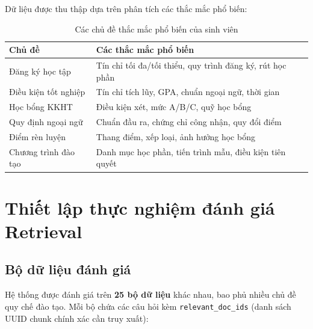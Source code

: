 \documentclass[../DoAn.tex]{subfiles}
\begin{document}
Dữ liệu được thu thập dựa trên phân tích các thắc mắc phổ biến:

\begin{table}[h]
\centering
\begin{tabular}{|l|p{8.5cm}|}
\hline
\textbf{Chủ đề} & \textbf{Các thắc mắc phổ biến} \\
\hline
Đăng ký học tập & Tín chỉ tối đa/tối thiểu, quy trình đăng ký, rút học phần \\
\hline
Điều kiện tốt nghiệp & Tín chỉ tích lũy, GPA, chuẩn ngoại ngữ, thời gian \\
\hline
Học bổng KKHT & Điều kiện xét, mức A/B/C, quỹ học bổng \\
\hline
Quy định ngoại ngữ & Chuẩn đầu ra, chứng chỉ công nhận, quy đổi điểm \\
\hline
Điểm rèn luyện & Thang điểm, xếp loại, ảnh hưởng học bổng \\
\hline
Chương trình đào tạo & Danh mục học phần, tiến trình mẫu, điều kiện tiên quyết \\
\hline
\end{tabular}
\caption{Các chủ đề thắc mắc phổ biến của sinh viên}
\end{table}

\section{Thiết lập thực nghiệm đánh giá Retrieval}

\subsection{Bộ dữ liệu đánh giá}

Hệ thống được đánh giá trên \textbf{25 bộ dữ liệu} khác nhau, bao phủ nhiều chủ đề quy chế đào tạo. Mỗi bộ chứa các câu hỏi kèm \texttt{relevant\_doc\_ids} (danh sách UUID chunk chính xác cần truy xuất):
\end{document}
